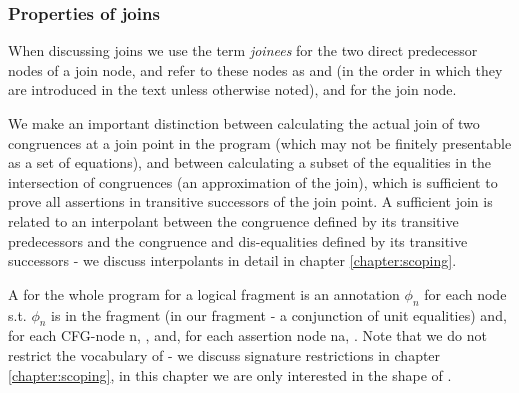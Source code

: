 \subsubsection*{Properties of joins}
When discussing joins we use the term \emph{joinees} for the two direct predecessor nodes of a join node, and refer to these nodes as  and   (in the order in which they are introduced in the text unless otherwise noted), and  for the join node.

We make an important distinction between calculating the actual join of two congruences at a join point in the program (which may not be finitely presentable as a set of equations), 
and between calculating a subset of the equalities in the intersection of congruences (an approximation of the join), which is sufficient to prove all assertions in transitive successors of the join point.
A sufficient join is related to an interpolant between the congruence defined by its transitive predecessors and the congruence and dis-equalities defined by its transitive successors - we discuss interpolants in detail in chapter \ref{chapter:scoping}.


A  for the whole program for a logical fragment is an annotation $\phi_n$ for each node s.t. $\phi_n$ is in the fragment (in our fragment - a conjunction of unit equalities) and, for each CFG-node n, , and, for each assertion node na, .  
Note that we do not restrict the vocabulary of  - we discuss signature restrictions in chapter \ref{chapter:scoping}, in this chapter we are only interested in the shape of .

